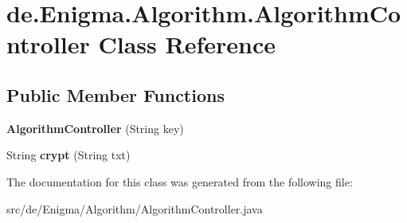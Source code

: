 \hypertarget{classde_1_1_enigma_1_1_algorithm_1_1_algorithm_controller}{}\section{de.\+Enigma.\+Algorithm.\+Algorithm\+Controller Class Reference}
\label{classde_1_1_enigma_1_1_algorithm_1_1_algorithm_controller}
\subsection*{Public Member Functions}
\begin{DoxyCompactItemize}
\item 
\mbox{\label{classde_1_1_enigma_1_1_algorithm_1_1_algorithm_controller_aa7d951c43a096438ab5b631c6c9ac6eb}} 
{\bfseries Algorithm\+Controller} (String key)
\item 
\mbox{\label{classde_1_1_enigma_1_1_algorithm_1_1_algorithm_controller_a394b7c3beb75fc428fc8415159e1e5b8}} 
String {\bfseries crypt} (String txt)
\end{DoxyCompactItemize}


The documentation for this class was generated from the following file\+:\begin{DoxyCompactItemize}
\item 
src/de/\+Enigma/\+Algorithm/Algorithm\+Controller.\+java\end{DoxyCompactItemize}
